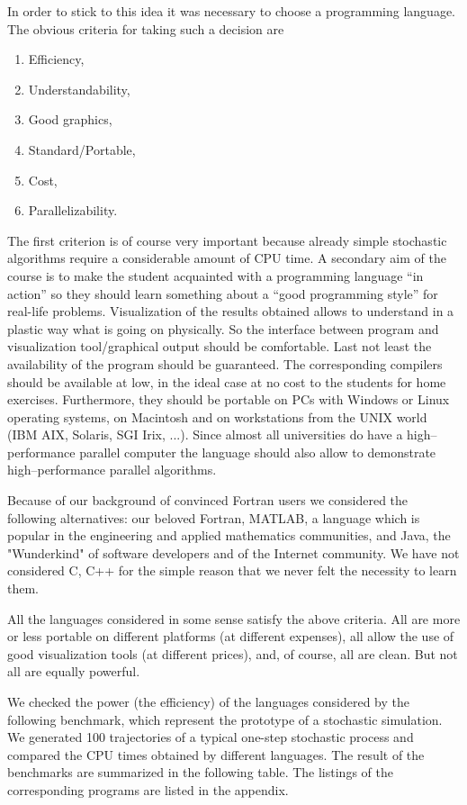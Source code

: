 In order to stick to this idea it was necessary to choose a programming 
language. The obvious criteria for taking such a decision are
\cite[]{GARCIA}
\begin{enumerate}
\item Efficiency,
\item Understandability,
\item Good graphics,
\item Standard/Portable,
\item Cost,
\item Parallelizability.
\end{enumerate}
The first criterion is of course very important because already simple 
stochastic algorithms require a considerable amount of CPU time.
A secondary aim of the course is to make the student acquainted with a 
programming language ``in action'' so they should learn something 
about a ``good 
programming style'' for real-life problems. Visualization of the results 
obtained allows to understand in a plastic way what is going on physically. So 
the interface between program and visualization tool/graphical output should
be comfortable. Last not least the availability of the program should be
guaranteed. The corresponding compilers should be available at low, in the 
ideal case at no cost to the students for home exercises. Furthermore, they
should be portable on PCs with Windows or Linux operating systems, on Macintosh
and on workstations from the UNIX world (IBM AIX, Solaris, SGI Irix, ...).
Since almost all universities do have a high--performance parallel computer 
the language should also allow to demonstrate high--performance parallel 
algorithms.

Because of our background of convinced Fortran users we considered the 
following alternatives: our beloved Fortran, MATLAB, a language which 
is popular in 
the engineering and applied mathematics communities, and Java, the 
"Wunderkind" of software developers and of the Internet community. We have 
not considered C, C++ for the simple reason that we never felt the necessity 
to learn them.

All the languages considered  in some sense satisfy the above criteria. All
are more  or less portable on different platforms (at different expenses), all
allow the use of good visualization tools (at different prices), and, of 
course, all are clean. But not all are equally powerful. 

We checked the power (the efficiency) of the languages considered by the 
following benchmark, which represent the prototype of a stochastic simulation. 
We generated 100 trajectories of a typical one-step stochastic process
and compared the CPU times obtained by different languages. The result
of the benchmarks are summarized in the following table. The listings
of the corresponding programs are listed in the appendix.

